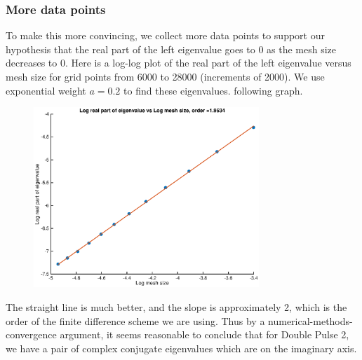 \documentclass[12pt]{article}
\begin{document}
\subsubsection*{More data points}
To make this more convincing, we collect more data points to support our hypothesis that the real part of the left eigenvalue goes to 0 as the mesh size decreases to 0. Here is a log-log plot of the real part of the left eigenvalue versus mesh size for grid points from 6000 to 28000 (increments of 2000). We use exponential weight $a = 0.2$ to find these eigenvalues.
following graph.
\begin{figure}[H]
\includegraphics[width=8.5cm]{double2logplot3.eps}
\end{figure}
The straight line is much better, and the slope is approximately 2, which is the order of the finite difference scheme we are using. Thus by a numerical-methods-convergence argument, it seems reasonable to conclude that for Double Pulse 2, we have a pair of complex conjugate eigenvalues which are on the imaginary axis.\\
\end{document}
